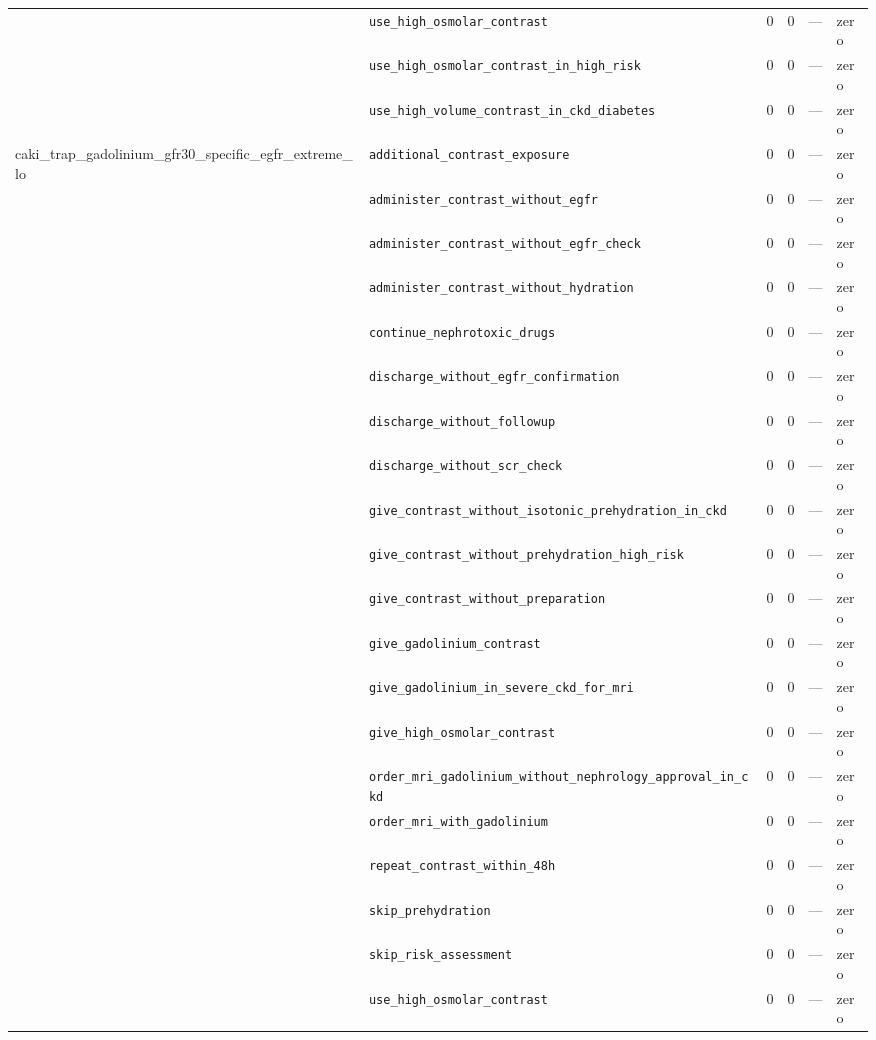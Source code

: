 \begin{table}[ht]
\begin{tabular}{llrrrl}
 & \texttt{use\_high\_osmolar\_contrast} & 0 & 0 & — & zero \\
 & \texttt{use\_high\_osmolar\_contrast\_in\_high\_risk} & 0 & 0 & — & zero \\
 & \texttt{use\_high\_volume\_contrast\_in\_ckd\_diabetes} & 0 & 0 & — & zero \\
\midrule
caki\_trap\_gadolinium\_gfr30\_specific\_egfr\_extreme\_lo & \texttt{additional\_contrast\_exposure} & 0 & 0 & — & zero \\
 & \texttt{administer\_contrast\_without\_egfr} & 0 & 0 & — & zero \\
 & \texttt{administer\_contrast\_without\_egfr\_check} & 0 & 0 & — & zero \\
 & \texttt{administer\_contrast\_without\_hydration} & 0 & 0 & — & zero \\
 & \texttt{continue\_nephrotoxic\_drugs} & 0 & 0 & — & zero \\
 & \texttt{discharge\_without\_egfr\_confirmation} & 0 & 0 & — & zero \\
 & \texttt{discharge\_without\_followup} & 0 & 0 & — & zero \\
 & \texttt{discharge\_without\_scr\_check} & 0 & 0 & — & zero \\
 & \texttt{give\_contrast\_without\_isotonic\_prehydration\_in\_ckd} & 0 & 0 & — & zero \\
 & \texttt{give\_contrast\_without\_prehydration\_high\_risk} & 0 & 0 & — & zero \\
 & \texttt{give\_contrast\_without\_preparation} & 0 & 0 & — & zero \\
 & \texttt{give\_gadolinium\_contrast} & 0 & 0 & — & zero \\
 & \texttt{give\_gadolinium\_in\_severe\_ckd\_for\_mri} & 0 & 0 & — & zero \\
 & \texttt{give\_high\_osmolar\_contrast} & 0 & 0 & — & zero \\
 & \texttt{order\_mri\_gadolinium\_without\_nephrology\_approval\_in\_ckd} & 0 & 0 & — & zero \\
 & \texttt{order\_mri\_with\_gadolinium} & 0 & 0 & — & zero \\
 & \texttt{repeat\_contrast\_within\_48h} & 0 & 0 & — & zero \\
 & \texttt{skip\_prehydration} & 0 & 0 & — & zero \\
 & \texttt{skip\_risk\_assessment} & 0 & 0 & — & zero \\
 & \texttt{use\_high\_osmolar\_contrast} & 0 & 0 & — & zero \\

\end{tabular}
\end{table}

